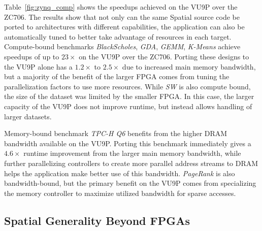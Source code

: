 Table~\ref{fig:zynq_comp} shows the speedups achieved on the VU9P over the ZC706. The results show that not only can the same Spatial source code be ported
to architectures with different capabilities, the application can also be automatically tuned to better take advantage of resources in each target.
Compute-bound benchmarks \emph{BlackScholes}, \emph{GDA}, \emph{GEMM}, \emph{K-Means} achieve speedups of up to $23\times$ on the VU9P over the ZC706. Porting these designs to the VU9P alone has a $1.2\times$ to $2.5\times$ due to increased main memory bandwidth, but a majority of the benefit of the larger FPGA comes from tuning the parallelization factors to use more resources.
While \emph{SW} is also compute bound, the size of the dataset was limited by the smaller FPGA. In this case, the larger capacity of the VU9P does not improve runtime, but instead allows handling of larger datasets.

Memory-bound benchmark \emph{TPC-H Q6} benefits from the higher DRAM bandwidth available on the VU9P. Porting this benchmark immediately gives a $4.6\times$ runtime improvement from the larger main memory bandwidth, while further parallelizing controllers to create more parallel address streams to DRAM helps the application make better use of this bandwidth. \emph{PageRank} is also bandwidth-bound, but the primary benefit on the VU9P comes from specializing the memory controller to maximize utilized bandwidth for sparse accesses.




\subsection{Spatial Generality Beyond FPGAs}
\label{plasticine-evaluation}

